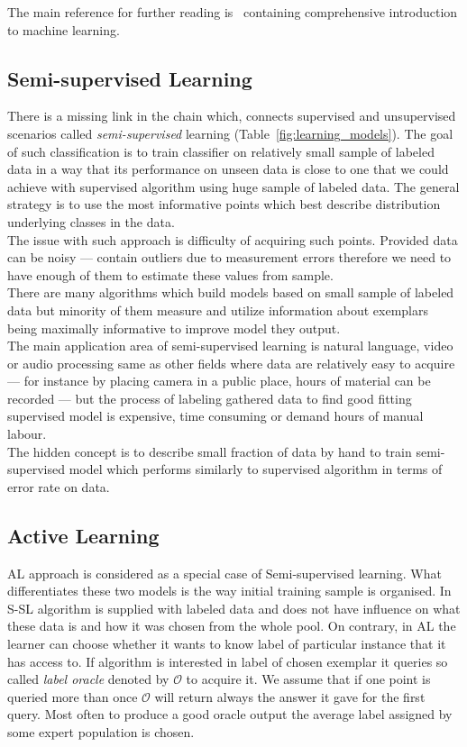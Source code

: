 \documentclass[12pt, a4paper, pdflatex, leqno]{report}
\begin{document}
The main reference for further reading is~\citep{flach2012machine} containing comprehensive introduction to machine learning.


\subsection{Semi-supervised Learning}
There is a missing link in the chain which, connects supervised and unsupervised scenarios called \emph{semi-supervised} learning (Table~\ref{fig:learning_models}). The goal of such classification is to train classifier on relatively small sample of labeled data in a way that its performance on unseen data is close to one that we could achieve with supervised algorithm using huge sample of labeled data. The general strategy is to use the most informative points which best describe distribution underlying classes in the data.\\
The issue with such approach is difficulty of acquiring such points. Provided data can be noisy --- contain outliers due to measurement errors therefore we need to have enough of them to estimate these values from sample.\\
There are many algorithms which build models based on small sample of labeled data but minority of them measure and utilize information about exemplars being maximally informative to improve model they output.\\

The main application area of semi-supervised learning is natural language, video or audio processing same as other fields where data are relatively easy to acquire --- for instance by placing camera in a public place, hours of material can be recorded --- but the process of labeling gathered data to find good fitting supervised model is expensive, time consuming or demand hours of manual labour.\\
The hidden concept is to describe small fraction of data by hand to train semi-supervised model which performs similarly to supervised algorithm in terms of error rate on data.

\subsection{Active Learning}
AL approach is considered as a special case of Semi-supervised learning. What differentiates these two models is the way initial training sample is organised. In S-SL algorithm is supplied with labeled data and does not have influence on what these data is and how it was chosen from the whole pool. On contrary, in AL the learner can choose whether it wants to know label of particular instance that it has access to. If algorithm is interested in label of chosen exemplar it queries so called \emph{label oracle} denoted by $\mathscr{O}$ to acquire it. We assume that if one point is queried more than once $\mathscr{O}$ will return always the answer it gave for the first query. Most often to produce a good oracle output the average label assigned by some expert population is chosen.\\
\end{document}
